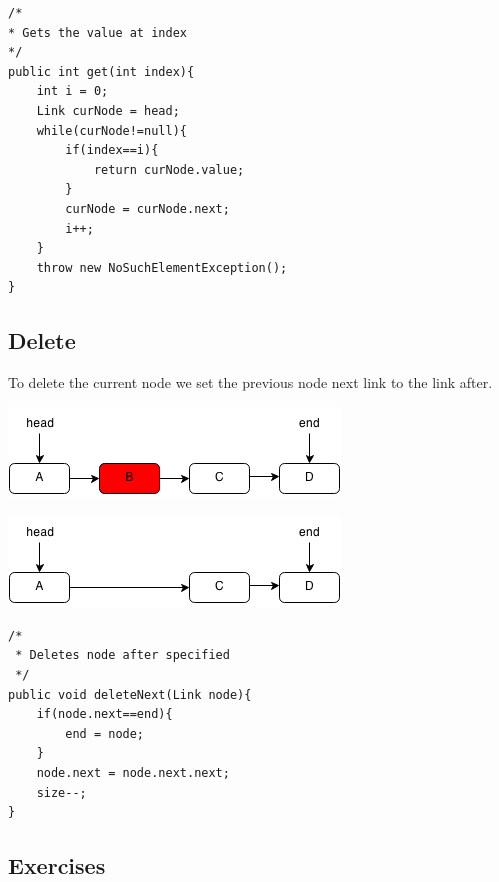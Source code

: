 \documentclass[11pt,oneside]{book}
\makeatletter
\def\maxwidth#1{\ifdim\Gin@nat@width>#1 #1\else\Gin@nat@width\fi}
\makeatother
\begin{document}
\begin{lstlisting}
/*
* Gets the value at index
*/
public int get(int index){
    int i = 0;
    Link curNode = head;
    while(curNode!=null){
        if(index==i){
            return curNode.value;
        }
        curNode = curNode.next;
        i++;
    }
    throw new NoSuchElementException();
}
\end{lstlisting}

\subsection{Delete}

To delete the current node we set the previous node next link to the link after.

\vspace{5px}\includegraphics[width=\maxwidth{\textwidth}]{linkedlistrem.png}

\vspace{5px}\includegraphics[width=\maxwidth{\textwidth}]{linkedlistrem2.png}

\begin{lstlisting}
/*
 * Deletes node after specified
 */
public void deleteNext(Link node){
    if(node.next==end){
        end = node;
    }
    node.next = node.next.next;
    size--;
}
\end{lstlisting}

\subsection{Exercises}
\end{document}
